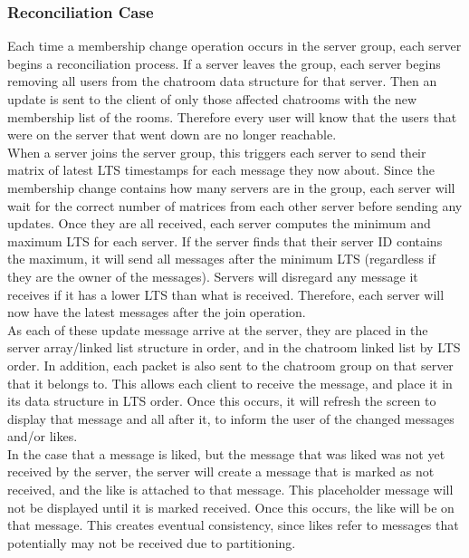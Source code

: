 \documentclass[12pt,journal,compsoc]{IEEEtran}
\begin{document}
\subsubsection{Reconciliation Case}
Each time a membership change operation occurs in the server group, each server begins a reconciliation process.  If a server leaves the group, each server begins removing all users from the chatroom data structure for that server.  Then an update is sent to the client of only those affected chatrooms with the new membership list of the rooms.  Therefore every user will know that the users that were on the server that went down are no longer reachable.  \\When a server joins the server group, this triggers each server to send their matrix of latest LTS timestamps for each message they now about.  Since the membership change contains how many servers are in the group, each server will wait for the correct number of matrices from each other server before sending any updates.  Once they are all received, each server computes the minimum and maximum LTS for each server.  If the server finds that their server ID contains the maximum, it will send all messages after the minimum LTS (regardless if they are the owner of the messages).  Servers will disregard any message it receives if it has a lower LTS than what is received.  Therefore, each server will now have the latest messages after the join operation.  \\
As each of these update message arrive at the server, they are placed in the server array/linked list structure in order, and in the chatroom linked list by LTS order.  In addition, each packet is also sent to the chatroom group on that server that it belongs to.  This allows each client to receive the message, and place it in its data structure in LTS order.  Once this occurs, it will refresh the screen to display that message and all after it, to inform the user of the changed messages and/or likes.\\
In the case that a message is liked, but the message that was liked was not yet received by the server, the server will create a message that is marked as not received, and the like is attached to that message.  This placeholder message will not be displayed until it is marked received.  Once this occurs, the like will be on that message.  This creates eventual consistency, since likes refer to messages that potentially may not be received due to partitioning.
\end{document}

